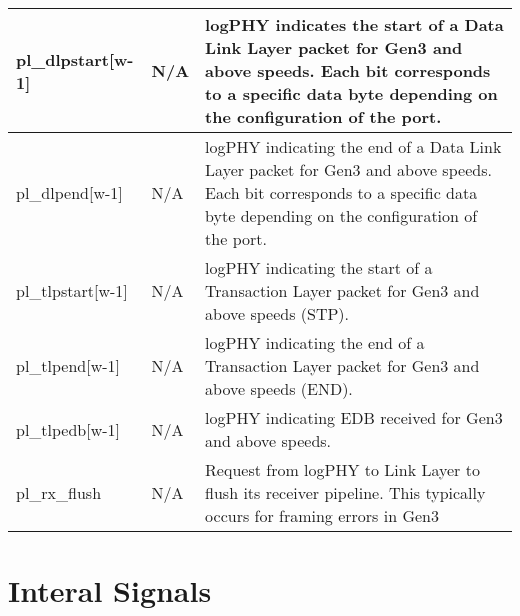 \begin{table}[H]

    \centering
  \begin{tabular}{ |m{26mm}|P{18mm}|m{60mm}|  }
  \hline

pl\_dlpstart[w-1] &N/A & logPHY indicates the start of a Data Link Layer packet for Gen3 and above speeds. Each
bit corresponds to a specific data byte depending on the configuration of the port.\\ \hline 
pl\_dlpend[w-1] &N/A & logPHY indicating the end of a Data Link Layer packet for Gen3 and above speeds. Each
bit corresponds to a specific data byte depending on the configuration of the port.\\ \hline
pl\_tlpstart[w-1] &N/A &logPHY indicating the start of a Transaction Layer packet for Gen3 and above speeds
(STP). \\ \hline
pl\_tlpend[w-1] &N/A & logPHY indicating the end of a Transaction Layer packet for Gen3 and above speeds
(END).\\ \hline
pl\_tlpedb[w-1] &N/A & logPHY indicating EDB received for Gen3 and above speeds. \\ \hline
pl\_rx\_flush &N/A & Request from logPHY to Link Layer to flush its receiver pipeline. This typically occurs for
framing errors in Gen3\\ \hline

\end{tabular}
\end{table}
\section{Interal Signals}


